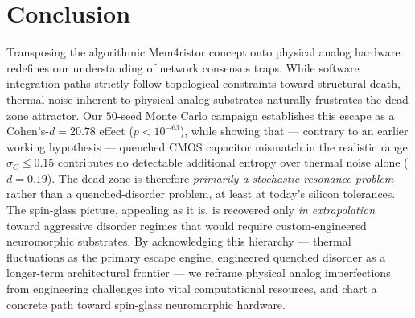 \documentclass[11pt,a4paper]{article}
\begin{document}
\section{Conclusion}
\label{sec:conclusion}
Transposing the algorithmic Mem4ristor concept onto physical analog hardware redefines our understanding of network consensus traps. While software integration paths strictly follow topological constraints toward structural death, thermal noise inherent to physical analog substrates naturally frustrates the dead zone attractor. Our $50$-seed Monte Carlo campaign establishes this escape as a Cohen's-$d = 20.78$ effect ($p < 10^{-63}$), while showing that --- contrary to an earlier working hypothesis --- quenched CMOS capacitor mismatch in the realistic range $\sigma_C \leq 0.15$ contributes no detectable additional entropy over thermal noise alone ($d = 0.19$). The dead zone is therefore \emph{primarily a stochastic-resonance problem} rather than a quenched-disorder problem, at least at today's silicon tolerances. The spin-glass picture, appealing as it is, is recovered only \emph{in extrapolation} toward aggressive disorder regimes that would require custom-engineered neuromorphic substrates. By acknowledging this hierarchy --- thermal fluctuations as the primary escape engine, engineered quenched disorder as a longer-term architectural frontier --- we reframe physical analog imperfections from engineering challenges into vital computational resources, and chart a concrete path toward spin-glass neuromorphic hardware.
\end{document}
